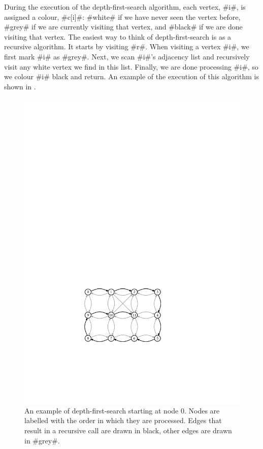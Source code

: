 During the execution of the depth-first-search algorithm, each vertex,
#i#, is assigned a colour, #c[i]#: #white# if we have never seen
the vertex before, #grey# if we are currently visiting that vertex,
and #black# if we are done visiting that vertex.  The easiest way to
think of depth-first-search is as a recursive algorithm.  It starts by
visiting #r#.  When visiting a vertex #i#, we first mark #i# as #grey#.
Next, we scan #i#'s adjacency list and recursively visit any white vertex
we find in this list.  Finally, we are done processing #i#, so we colour
#i# black and return.
An example of the execution of this algorithm is shown in .

\begin{figure}
	\begin{center}
		\includegraphics[scale=0.90909]{figs/graph-dfs}
	\end{center}
	\caption[Depth-first-search]{An example of depth-first-search starting at node 0. Nodes are
		labelled with the order in which they are processed.  Edges that
		result in a recursive call are drawn in black, other edges
		are drawn in #grey#.}
\end{figure}

